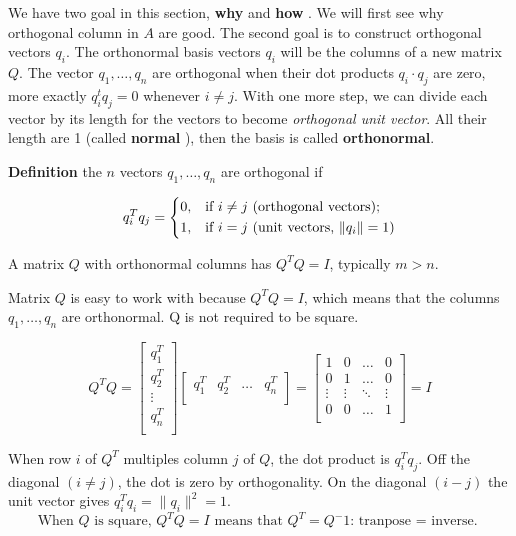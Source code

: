 We have two goal in this section, \textbf{why} and \textbf{how} . We will first see why orthogonal column in \(A\) are good. The second goal is to construct orthogonal vectors \(q_i\). The orthonormal basis vectors \(q_i\) will be the columns of a new matrix \(Q\). The vector \(q_1, \ldots, q_n\) are orthogonal when their dot products \(q_i \cdot q_j\) are zero, more exactly \(q^t_i q_j = 0\) whenever \(i \neq j\). With one more step, we can divide each vector by its length for the vectors to become \emph{orthogonal unit vector}. All their length are 1 (called \textbf{normal} ), then the basis is called \textbf{orthonormal}.          

\textbf{Definition} the \(n\) vectors \(q_1, \ldots, q_n\) are orthogonal if 

\[
    q^T_i q_j = 
    \begin{dcases}
      0, & \text{if } i \neq j \text{ (orthogonal vectors)}; \\
      1, & \text{if } i = j \text{ (unit vectors, } \lVert q_i \rVert = 1 \text{)}
    \end{dcases}
\]

A matrix \(Q\) with orthonormal columns has \(Q^T Q = I\), typically \(m > n\). 

Matrix \(Q\) is easy to work with because \(Q^T Q = I\), which means that the columns \(q_1, \ldots, q_n\) are orthonormal. Q is not required to be square. 

\[
    Q^T Q = 
    \begin{bmatrix}
         q^T_1 \\
         q^T_2 \\
         \vdots \\
         q^T_n \\
    \end{bmatrix}
    \begin{bmatrix}
        q^T_1 & q^T_2 & \ldots & q^T_n  \\
    \end{bmatrix}
    = 
    \begin{bmatrix}
        1 & 0 & \ldots & 0  \\
        0 & 1 & \ldots & 0  \\
        \vdots & \vdots & \ddots & \vdots  \\
        0 & 0 & \ldots & 1  \\
    \end{bmatrix}
    = I 
\]

When row \(i\) of \(Q^T\) multiples column \(j\) of \(Q\), the dot product is \(q^T_i q_j\). Off the diagonal \((i \neq j)\), the dot is zero by orthogonality. On the diagonal \((i - j)\) the unit vector gives \(q^T_i q_i = \lVert q_i \rVert^2 = 1\). 
\[
    \text{When \(Q\) is square, \(Q^T Q = I\) means that \(Q^T = Q^-1\): tranpose = inverse.   }
\]       

